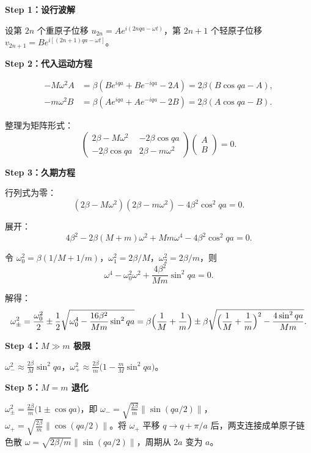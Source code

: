 \begin{derivationbox}
\textbf{Step 1：设行波解}

设第 $2n$ 个重原子位移 $u_{2n}=Ae^{i(2nqa-\omega t)}$，第 $2n+1$ 个轻原子位移 $v_{2n+1}=Be^{i[(2n+1)qa-\omega t]}$。

\textbf{Step 2：代入运动方程}

\begin{align*}
-M\omega^2 A &= \beta(B e^{iqa}+B e^{-iqa}-2A)=2\beta(B\cos qa-A),\\
-m\omega^2 B &= \beta(A e^{iqa}+A e^{-iqa}-2B)=2\beta(A\cos qa-B).
\end{align*}

整理为矩阵形式：
\[
\begin{pmatrix}2\beta-M\omega^2 & -2\beta\cos qa\\ -2\beta\cos qa & 2\beta-m\omega^2\end{pmatrix}\begin{pmatrix}A\\ B\end{pmatrix}=0.
\]

\textbf{Step 3：久期方程}

行列式为零：
\[
(2\beta-M\omega^2)(2\beta-m\omega^2)-4\beta^2\cos^2 qa=0.
\]

展开：
\[
4\beta^2-2\beta(M+m)\omega^2+Mm\omega^4-4\beta^2\cos^2 qa=0.
\]

令 $\omega_0^2=\beta(1/M+1/m)$，$\omega_1^2=2\beta/M$，$\omega_2^2=2\beta/m$，则
\[
\omega^4-\omega_0^2\omega^2+\frac{4\beta^2}{Mm}\sin^2 qa=0.
\]

解得：
\[
\omega_{\pm}^2=\frac{\omega_0^2}{2}\pm\frac{1}{2}\sqrt{\omega_0^4-\frac{16\beta^2}{Mm}\sin^2 qa}
=\beta\Bigl(\frac{1}{M}+\frac{1}{m}\Bigr)\pm\beta\sqrt{\Bigl(\frac{1}{M}+\frac{1}{m}\Bigr)^2-\frac{4\sin^2 qa}{Mm}}.
\]

\textbf{Step 4：$M\gg m$ 极限}

$\omega_{-}^2\approx\frac{2\beta}{M}\sin^2 qa$，$\omega_{+}^2\approx\frac{2\beta}{m}\bigl(1-\frac{m}{M}\sin^2 qa\bigr)$。

\textbf{Step 5：$M=m$ 退化}

$\omega_{\pm}^2=\frac{2\beta}{m}\bigl(1\pm\cos qa\bigr)$，即 $\omega_{-}=\sqrt{\frac{2\beta}{m}}\|\sin(qa/2)\|$，$\omega_{+}=\sqrt{\frac{2\beta}{m}}\|\cos(qa/2)\|$。将 $\omega_{+}$ 平移 $q\to q+\pi/a$ 后，两支连接成单原子链色散 $\omega=\sqrt{2\beta/m}\|\sin(qa/2)\|$，周期从 $2a$ 变为 $a$。
\end{derivationbox}

\vspace{1em}
